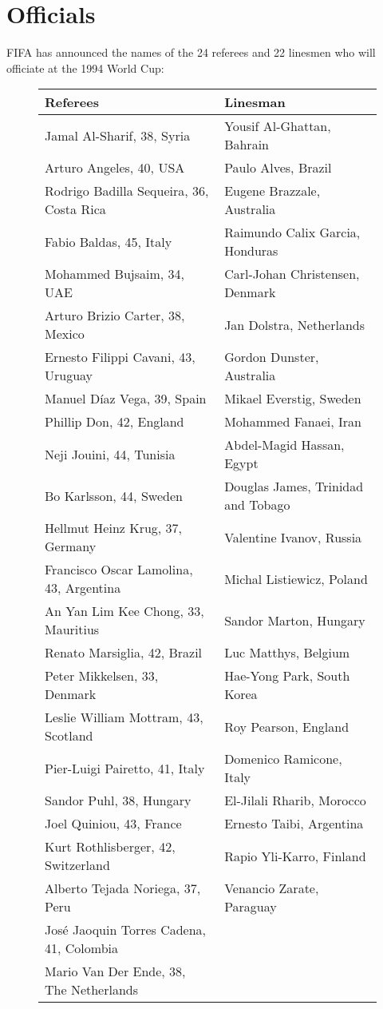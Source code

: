 \chapter{Officials}
\newline
\newline
FIFA has announced the names of the 24 referees and 22 linesmen who will officiate at the 1994 World Cup:
\begin{figure}[H]
\begin{tabular}{l l}
Referees & Linesman \\ \hline
Jamal Al-Sharif, 38, Syria & Yousif Al-Ghattan, Bahrain \\
Arturo Angeles, 40, USA & Paulo Alves, Brazil \\
Rodrigo Badilla Sequeira, 36, Costa Rica & Eugene Brazzale, Australia \\
Fabio Baldas, 45, Italy & Raimundo Calix Garcia, Honduras \\
Mohammed Bujsaim, 34, UAE  & Carl-Johan Christensen, Denmark \\
Arturo Brizio Carter, 38, Mexico & Jan Dolstra, Netherlands \\
Ernesto Filippi Cavani, 43, Uruguay & Gordon Dunster, Australia \\
Manuel D{\'i}az Vega, 39, Spain & Mikael Everstig, Sweden \\
Phillip Don, 42, England & Mohammed Fanaei, Iran \\
Neji Jouini, 44, Tunisia & Abdel-Magid Hassan, Egypt \\
Bo Karlsson, 44, Sweden & Douglas James, Trinidad and Tobago \\
Hellmut Heinz Krug, 37, Germany & Valentine Ivanov, Russia \\
Francisco Oscar Lamolina, 43, Argentina & Michal Listiewicz, Poland \\
An Yan Lim Kee Chong, 33, Mauritius & Sandor Marton, Hungary \\
Renato Marsiglia, 42, Brazil & Luc Matthys, Belgium \\
Peter Mikkelsen, 33, Denmark & Hae-Yong Park, South Korea \\
Leslie William Mottram, 43, Scotland & Roy Pearson, England \\
Pier-Luigi Pairetto, 41, Italy  & Domenico Ramicone, Italy \\
Sandor Puhl, 38, Hungary & El-Jilali Rharib, Morocco \\
Joel Quiniou, 43, France & Ernesto Taibi, Argentina \\
Kurt Rothlisberger, 42, Switzerland & Rapio Yli-Karro, Finland \\
Alberto Tejada Noriega, 37, Peru & Venancio Zarate, Paraguay \\
Jos{\'e} Jaoquin Torres Cadena, 41, Colombia & \\
Mario Van Der Ende, 38, The Netherlands & \\
\end{tabular}
\end{figure}
